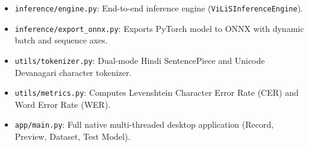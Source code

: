 \documentclass[11pt,a4paper]{report}
\begin{document}
\begin{itemize}
    \item \texttt{inference/engine.py}: End-to-end inference engine (\texttt{ViLiSInferenceEngine}).
    \item \texttt{inference/export\_onnx.py}: Exports PyTorch model to ONNX with dynamic batch and sequence axes.
    \item \texttt{utils/tokenizer.py}: Dual-mode Hindi SentencePiece and Unicode Devanagari character tokenizer.
    \item \texttt{utils/metrics.py}: Computes Levenshtein Character Error Rate (CER) and Word Error Rate (WER).
    \item \texttt{app/main.py}: Full native multi-threaded desktop application (Record, Preview, Dataset, Test Model).
\end{itemize}
\end{document}
